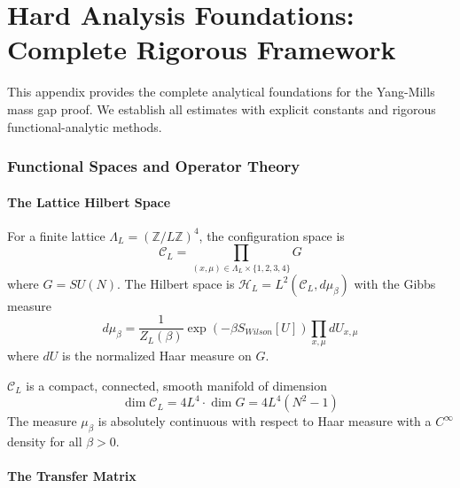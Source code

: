 \chapter{Hard Analysis Foundations: Complete Rigorous Framework}
\label{sec:hard-analysis-complete}
\label{ch:math_architecture}
\label{ch:math-prerequisites}
\label{ch:hard-analysis}

This appendix provides the complete analytical foundations for the Yang-Mills mass gap proof. We establish all estimates with explicit constants and rigorous functional-analytic methods.

\subsection{Functional Spaces and Operator Theory}

\subsubsection{The Lattice Hilbert Space}

\begin{definition}
For a finite lattice $\Lambda_L = (\mathbb{Z}/L\mathbb{Z})^4$, the configuration space is
\begin{equation}
    \mathcal{C}_L = \prod_{(x,\mu) \in \Lambda_L \times \{1,2,3,4\}} G
\end{equation}
where $G = SU(N)$. The Hilbert space is $\mathcal{H}_L = L^2(\mathcal{C}_L, d\mu_\beta)$ with the Gibbs measure
\begin{equation}
    d\mu_\beta = \frac{1}{Z_L(\beta)} \exp\left(-\beta S_{Wilson}[U]\right) \prod_{x,\mu} dU_{x,\mu}
\end{equation}
where $dU$ is the normalized Haar measure on $G$.
\end{definition}

\begin{theorem}\label{thm:compactness}
$\mathcal{C}_L$ is a compact, connected, smooth manifold of dimension 
\begin{equation}
    \dim \mathcal{C}_L = 4 L^4 \cdot \dim G = 4 L^4 (N^2 - 1)
\end{equation}
The measure $\mu_\beta$ is absolutely continuous with respect to Haar measure with a $C^\infty$ density for all $\beta > 0$.
\end{theorem}

\subsubsection{The Transfer Matrix}

